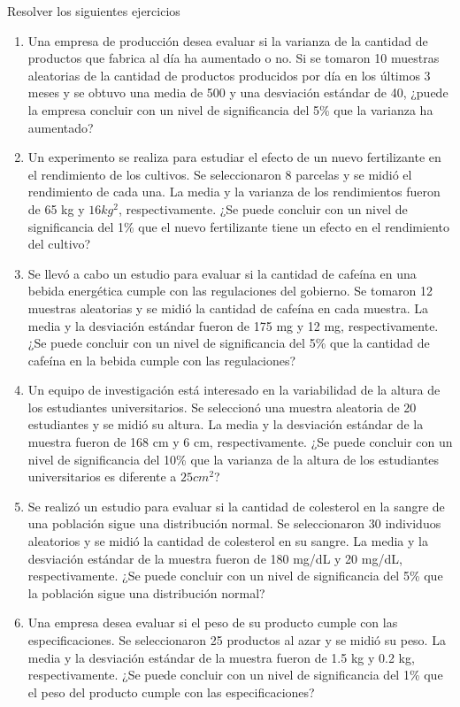 \begin{Ejer}  Resolver los siguientes ejercicios

\begin{enumerate}
    \item Una empresa de producción desea evaluar si la varianza de la cantidad de productos que fabrica al día ha aumentado o no. Si se tomaron 10 muestras aleatorias de la cantidad de productos producidos por día en los últimos 3 meses y se obtuvo una media de 500 y una desviación estándar de 40, ¿puede la empresa concluir con un nivel de significancia del 5\% que la varianza ha aumentado?
    \item Un experimento se realiza para estudiar el efecto de un nuevo fertilizante en el rendimiento de los cultivos. Se seleccionaron 8 parcelas y se midió el rendimiento de cada una. La media y la varianza de los rendimientos fueron de 65 kg y $16 kg^2$, respectivamente. ¿Se puede concluir con un nivel de significancia del 1\% que el nuevo fertilizante tiene un efecto en el rendimiento del cultivo?
    \item Se llevó a cabo un estudio para evaluar si la cantidad de cafeína en una bebida energética cumple con las regulaciones del gobierno. Se tomaron 12 muestras aleatorias y se midió la cantidad de cafeína en cada muestra. La media y la desviación estándar fueron de 175 mg y 12 mg, respectivamente. ¿Se puede concluir con un nivel de significancia del 5\% que la cantidad de cafeína en la bebida cumple con las regulaciones?
    \item Un equipo de investigación está interesado en la variabilidad de la altura de los estudiantes universitarios. Se seleccionó una muestra aleatoria de 20 estudiantes y se midió su altura. La media y la desviación estándar de la muestra fueron de 168 cm y 6 cm, respectivamente. ¿Se puede concluir con un nivel de significancia del 10\% que la varianza de la altura de los estudiantes universitarios es diferente a $25cm^2$?
    \item Se realizó un estudio para evaluar si la cantidad de colesterol en la sangre de una población sigue una distribución normal. Se seleccionaron 30 individuos aleatorios y se midió la cantidad de colesterol en su sangre. La media y la desviación estándar de la muestra fueron de 180 mg/dL y 20 mg/dL, respectivamente. ¿Se puede concluir con un nivel de significancia del 5\% que la población sigue una distribución normal?
    \item Una empresa desea evaluar si el peso de su producto cumple con las especificaciones. Se seleccionaron 25 productos al azar y se midió su peso. La media y la desviación estándar de la muestra fueron de 1.5 kg y 0.2 kg, respectivamente. ¿Se puede concluir con un nivel de significancia del 1\% que el peso del producto cumple con las especificaciones?

\end{enumerate}
\end{Ejer}

